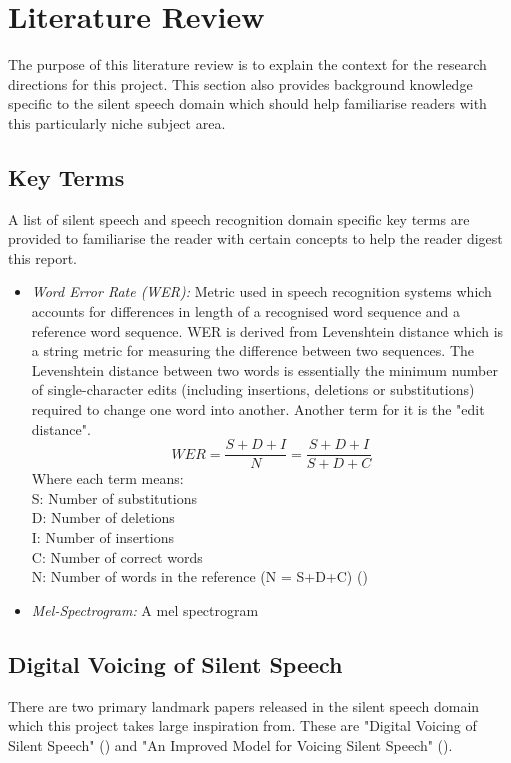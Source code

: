 \chapter{Literature Review} \label{chap:lit-review}

The purpose of this literature review is to explain the context
for the research directions for this project. This section also
provides background knowledge specific to the silent speech
domain which should help familiarise readers with this particularly
niche subject area.

\section{Key Terms}

A list of silent speech and speech recognition domain specific key terms are provided
to familiarise the reader with certain concepts to help the reader digest this report.

\begin{itemize}
\item \emph{Word Error Rate (WER):}
Metric used in speech recognition systems which accounts for differences in length of
a recognised word sequence and a reference word sequence. WER is derived from
Levenshtein distance  which is a string metric for measuring the difference between two
sequences. The Levenshtein distance between two words is essentially the minimum number of
single-character edits (including insertions, deletions or substitutions) required to
change one word into another. Another term for it is the "edit distance".
\[
  WER
  = \dfrac{S + D + I}{N}
  = \dfrac{S + D + I}{S + D + C}
\]
Where each term means:\\
S: Number of substitutions\\
D: Number of deletions\\
I: Number of insertions\\
C: Number of correct words\\
N: Number of words in the reference (N = S+D+C)
(\cite{1966SPhD...10..707L})
\item \emph{Mel-Spectrogram:}
A mel spectrogram 
\end{itemize}

\section{Digital Voicing of Silent Speech}

There are two primary landmark papers released in the silent speech domain
which this project takes large inspiration from. These are
"Digital Voicing of Silent Speech" (\cite{gaddy2020digital}) and
"An Improved Model for Voicing Silent Speech" (\cite{gaddy2021improved}).

